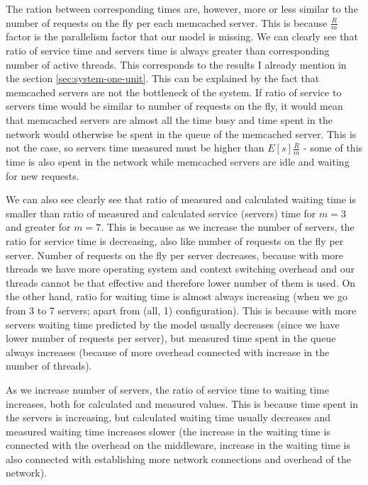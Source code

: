 \documentclass[11pt]{article}
\begin{document}
The ration between corresponding times are, however, more or less similar to the number of requests on the fly per each memcached server. This is because $\frac{R}{m}$ factor is the parallelism factor that our model is missing. We can clearly see that ratio of service time and servers time is always greater than corresponding number of active threads. This corresponds to the results I already mention in the section \ref{sec:system-one-unit}. This can be explained by the fact that memcached servers are not the bottleneck of the system. If ratio of service to servers time would be similar to number of requests on the fly, it would mean that memcached servers are almost all the time busy and time spent in the network would otherwise be spent in the queue of the memcached server. This is not the case, so servers time measured must be higher than $E[s]\frac{R}{m}$ - some of this time is also spent in the network while memcached servers are idle and waiting for new requests.

We can also see clearly see that ratio of measured and calculated waiting time is smaller than ratio of measured and calculated service (servers) time for $m=3$ and greater for $m=7$. This is because as we increase the number of servers, the ratio for service time is decreasing, also like number of requests on the fly per server. Number of requests on the fly per server decreases, because with more threads we have more operating system and context switching overhead and our threads cannot be that effective and therefore lower number of them is used. On the other hand, ratio for waiting time is almost always increasing (when we go from 3 to 7 servers; apart from (all, 1) configuration). This is because with more servers waiting time predicted by the model usually decreases (since we have lower number of requests per server), but measured time spent in the queue always increases (because of more overhead connected with increase in the number of threads).

As we increase number of servers, the ratio of service time to waiting time increases, both for calculated and measured values. This is because time spent in the servers is increasing, but calculated waiting time usually decreases and measured waiting time increases slower (the increase in the waiting time is connected with the overhead on the middleware, increase in the waiting time is also connected with establishing more network connections and overhead of the network).

\end{document}
